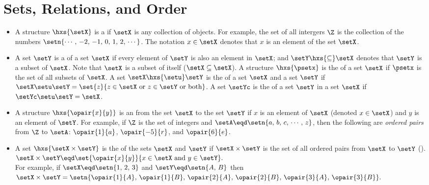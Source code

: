 \section{Sets, Relations, and Order}
\begin{itemize}
  \item A structure $\hxs{\setX}$ is a  if $\setX$ is any collection of objects.
        For example, the set of all intergers $\Z$ is the collection of the numbers
        $\setn{\cdots,\, -2,\, -1,\, 0,\, 1,\, 2,\, \cdots}$.%
        The notation $x\in\setX$ denotes that $x$ is an element of the set $\setX$.

  \item A set $\setY$ is a  of a set $\setX$ if every element of $\setY$ is also an element in $\setX$;
        and $\setY\hxs{\subseteq}\setX$ denotes that $\setY$ is a subset of $\setX$.
        Note that $\setX$ is a subset of itself ($\setX\subseteq\setX$).
        A structure $\hxs{\psetx}$ is the  of a set $\setX$ if 
        $\psetx$ is the set  of all subsets of $\setX$.
        A set $\setX\hxs{\setu}\setY$ is the  of a set $\setX$ and a set $\setY$ if 
        $\setX\setu\setY=\set{z}{z\in\setX \text{ or } z\in\setY \text{ or both}}$.
        A set $\setYc$ is the  of a set $\setY$ in a set $\setX$ if
        $\setYc\setu\setY=\setX$.

  \item A structure $\hxs{\opair{x}{y}}$ is an  from the set $\setX$ to the set $\setY$
        if $x$ is an element of $\setX$ (denoted $x\in\setX$) and $y$ is an element of $\setY$.
        For example, if $\Z$ is the set of integers and $\setA\eqd\setn{a,\,b,\,c,\,\cdots,\,z}$, then
        the following are \emph{ordered pairs} from $\Z$ to $\setA$:
        $\opair{1}{a}$, $\opair{-5}{r}$, and $\opair{6}{e}$.%

  \item A set $\hxs{\setX\times\setY}$ is the  of the sets $\setX$ and $\setY$
        if $\setX\times\setY$ is the set of all ordered pairs from $\setX$ to $\setY$ ().
          \\\indentx$\setX\times\setY \eqd \set{{\opair{x}{y}}}{x\in\setX\text{ and }y\in\setY}.$\\
        For example, if $\setX\eqd\setn{1,\,2,\,3}$ and $\setY\eqd\setn{A,\,B}$ then
          \\\indentx$\setX\times\setY = \setn{\opair{1}{A},\,\opair{1}{B},\,\opair{2}{A},\,\opair{2}{B},\,\opair{3}{A},\,\opair{3}{B}}.$


\end{itemize}
